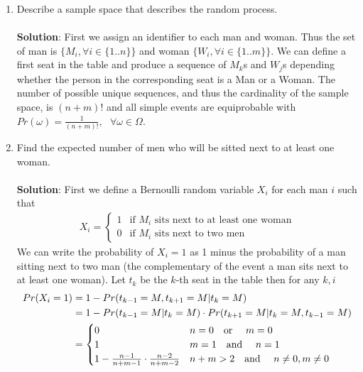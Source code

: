 \documentclass[a4paper]{article}
\begin{document}
\begin{enumerate}
    \item  Describe a sample space that describes the random process. \\ \\
    \textbf{Solution}: First we assign an identifier to each man and woman. Thus the set of man is $\{M_i, \forall i \in \{1..n\}\}$ and woman $\{W_i, \forall i \in \{1..m\}\}$. We can define a first seat in the table and produce a sequence of $M_k$s and $W_j$s
    depending whether the person in the corresponding seat is a Man or a Woman. The number of possible unique
    sequences, and thus the cardinality of the sample space, is $(n+m)!$ and all simple events are equiprobable with $Pr(\omega) = \frac{1}{(n+m)!},\text{ } \forall \omega \in \Omega$.
    \newpage
    \item  Find the expected number of men who will be sitted next to at least one woman. \\ \\
    \textbf{Solution}: First we define a Bernoulli random variable $X_i$ for each man $i$ such that
    \begin{align*}
    X_i =
    \begin{cases}
        1 & \text{if $M_i$ sits next to at least one woman} \\
        0 & \text{if $M_i$ sits next to two men}
    \end{cases}
    \end{align*}
    \iffalse
    We can write the probability of $X_i = 1$ as 1 minus the probability of a man sitting next to two man (the complementary of the event a man sits next to at least one woman). Let $t_k$ be the $k$-th seat in the table then for any $k, i$
    \begin{align*}
        Pr(X_i = 1) &= 1 - Pr(t_{k - 1} = M, t_{k + 1} = M | t_k = M) \\
        &= 1 - Pr(t_{k-1} = M | t_k = M) \cdot Pr(t_{k+1} = M | t_k = M, t_{k - 1} = M) \\ 
        &=
        \begin{cases}
            0 & n = 0 \text{\quad or \quad} m = 0\\
            1 & m = 1 \text{\quad and \quad} n = 1 \\
            1 - \frac{n-1}{n+m-1} \cdot \frac{n-2}{n+m-2} & n + m > 2 \text{\quad and \quad} n \neq 0, m \neq 0\\
        \end{cases}
    \end{align*}

\end{enumerate}
\end{document}
